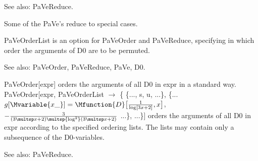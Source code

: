 See also:  PaVeReduce.


Some of the PaVe's reduce to special cases.







PaVeOrderList is an option for PaVeOrder and PaVeReduce, specifying in which order the arguments of D0 are to be permuted.

See also: PaVeOrder, PaVeReduce, PaVe, D0.



PaVeOrder[expr] orders the arguments of all D0 in expr in a standard way. PaVeOrder[expr, PaVeOrderList \(\rightarrow \) \{ \{..., s, u,
  ...\}, \{... \(g[\Mvariable{x\_}]=\Mfunction{D}\big[\frac{1}{\log [3x+2]},x\big]\), \(-\frac{3}{(3\multsp x+2)\multsp {{\log}^2}(3\multsp x+2)}\)
...\}, ...\}] orders the arguments of all D0 in expr according to the specified ordering lists. The lists may contain only a subsequence
  of the D0-variables.

See also:  PaVeReduce.






